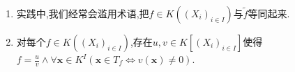 \begin{remark}{}{}
	\begin{enumerate}
		\item 实践中,我们经常会滥用术语,把$f\in K((X_{i})_{i\in I})$与$\tilde{f}$等同起来.
		\item 对每个$f\in K((X_{i})_{i\in I})$,存在$u,v\in K[(X_{i})_{i\in I}]$使得$f=\frac{u}{v}\wedge\forall\mathbf{x}\in K^{I}\left(\mathbf{x}\in T_{f}\iff v\left(\mathbf{x}\right)\neq 0\right)$.
	\end{enumerate}
\end{remark}




















































